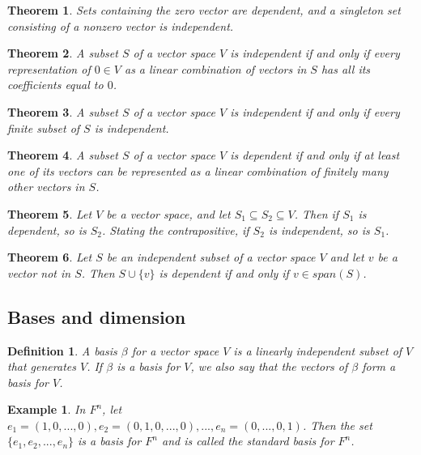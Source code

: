 \documentclass[a4paper]{article}
\newtheorem{mytheorem}{Theorem}
\newtheorem{example}{Example}
\newtheorem{mydef}{Definition}
\numberwithin{mytheorem}{section}
\numberwithin{mydef}{section}
\numberwithin{example}{section}
\begin{document}
\begin{mytheorem} Sets containing the zero vector are dependent, and a singleton set consisting of a nonzero vector is independent. 
\end{mytheorem}

\begin{mytheorem} A subset $S$ of a vector space $V$ is independent if and only if every representation of $0 \in V$ as a linear combination of vectors in $S$ has all its coefficients equal to $0$.
\end{mytheorem}

\begin{mytheorem} A subset $S$ of a vector space $V$ is independent if and only if every finite subset of $S$ is independent.
\end{mytheorem}

\begin{mytheorem} A subset $S$ of a vector space $V$ is dependent if and only if at least one of its vectors can be represented as a linear combination of finitely many other vectors in $S$.
\end{mytheorem}

\begin{mytheorem}Let $V$ be a vector space, and let $S_{1} \subseteq S_{2} \subseteq V$. Then if $S_{1}$ is dependent, so is $S_{2}$. Stating the contrapositive, if $S_{2}$ is independent, so is $S_{1}$.
\end{mytheorem}

\begin{mytheorem}Let $S$ be an independent subset of a vector space $V$ and let $v$ be a vector not in $S$. Then $S \cup \{ v \}$ is dependent if and only if $v \in span(S)$.
\end{mytheorem}


\subsection{Bases and dimension}

\begin{mydef} A basis $\beta$ for a vector space $V$ is a linearly independent subset of $V$ that generates $V$. If $\beta$ is a basis for $V$, we also say that the vectors of $\beta$ form a basis for $V$.
\end{mydef}

\begin{example} In $F^{n}$, let $e_{1} = (1,0,...,0), e_{2} = (0,1,0,...,0), ..., e_{n} = (0,...,0,1)$. Then the set $\{ e_{1},e_{2},...,e_{n} \}$ is a basis for $F^{n}$ and is called the standard basis for $F^{n}$.
\end{example}
\end{document}
